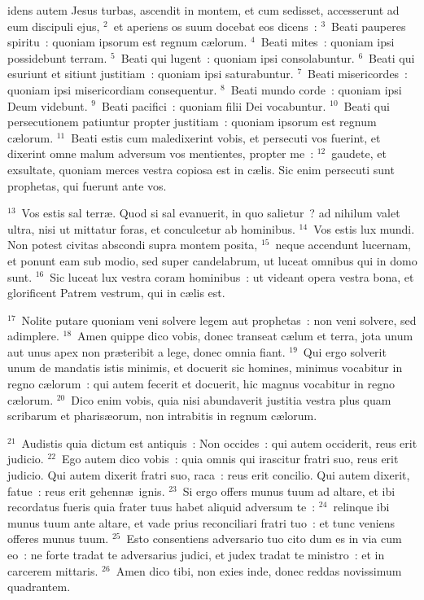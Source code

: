 \bchapter
{}idens autem Jesus turbas, ascendit in montem, et cum sedisset, accesserunt ad eum discipuli ejus,
${}^{2}$~et aperiens os suum docebat eos dicens~:
${}^{3}$~Beati pauperes spiritu~: quoniam ipsorum est regnum c\ae lorum.
${}^{4}$~Beati mites~: quoniam ipsi possidebunt terram.
${}^{5}$~Beati qui lugent~: quoniam ipsi consolabuntur.
${}^{6}$~Beati qui esuriunt et sitiunt justitiam~: quoniam ipsi saturabuntur.
${}^{7}$~Beati misericordes~: quoniam ipsi misericordiam consequentur.
${}^{8}$~Beati mundo corde~: quoniam ipsi Deum videbunt.
${}^{9}$~Beati pacifici~: quoniam filii Dei vocabuntur.
${}^{10}$~Beati qui persecutionem patiuntur propter justitiam~: quoniam ipsorum est regnum c\ae lorum.
${}^{11}$~Beati estis cum maledixerint vobis, et persecuti vos fuerint, et dixerint omne malum adversum vos mentientes, propter me~:
${}^{12}$~gaudete, et exsultate, quoniam merces vestra copiosa est in c\ae lis. Sic enim persecuti sunt prophetas, qui fuerunt ante vos.


${}^{13}$~Vos estis sal terr\ae . Quod si sal evanuerit, in quo salietur~? ad nihilum valet ultra, nisi ut mittatur foras, et conculcetur ab hominibus.
${}^{14}$~Vos estis lux mundi. Non potest civitas abscondi supra montem posita,
${}^{15}$~neque accendunt lucernam, et ponunt eam sub modio, sed super candelabrum, ut luceat omnibus qui in domo sunt.
${}^{16}$~Sic luceat lux vestra coram hominibus~: ut videant opera vestra bona, et glorificent Patrem vestrum, qui in c\ae lis est.


${}^{17}$~Nolite putare quoniam veni solvere legem aut prophetas~: non veni solvere, sed adimplere.
${}^{18}$~Amen quippe dico vobis, donec transeat c\ae lum et terra, jota unum aut unus apex non pr\ae teribit a lege, donec omnia fiant.
${}^{19}$~Qui ergo solverit unum de mandatis istis minimis, et docuerit sic homines, minimus vocabitur in regno c\ae lorum~: qui autem fecerit et docuerit, hic magnus vocabitur in regno c\ae lorum.
${}^{20}$~Dico enim vobis, quia nisi abundaverit justitia vestra plus quam scribarum et pharis\ae orum, non intrabitis in regnum c\ae lorum.


${}^{21}$~Audistis quia dictum est antiquis~: Non occides~: qui autem occiderit, reus erit judicio.
${}^{22}$~Ego autem dico vobis~: quia omnis qui irascitur fratri suo, reus erit judicio. Qui autem dixerit fratri suo, raca~: reus erit concilio. Qui autem dixerit, fatue~: reus erit gehenn\ae\ ignis.
${}^{23}$~Si ergo offers munus tuum ad altare, et ibi recordatus fueris quia frater tuus habet aliquid adversum te~:
${}^{24}$~relinque ibi munus tuum ante altare, et vade prius reconciliari fratri tuo~: et tunc veniens offeres munus tuum.
${}^{25}$~Esto consentiens adversario tuo cito dum es in via cum eo~: ne forte tradat te adversarius judici, et judex tradat te ministro~: et in carcerem mittaris.
${}^{26}$~Amen dico tibi, non exies inde, donec reddas novissimum quadrantem.


